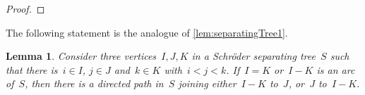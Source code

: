 \documentclass{amsart}
\newtheorem{lemma}[theorem]{Lemma}
\theoremstyle{definition}
\begin{document}
\begin{proof}
\end{proof}

The following statement is the analogue of \cref{lem:separatingTree1}.

\begin{lemma}
\label{lem:SchroderSeparatingTree1}
Consider three vertices~$I,J,K$ in a Schröder separating tree~$S$ such that there is~$i \in I$, $j \in J$ and~$k \in K$ with~$i < j < k$.
If~$I = K$ or~$I - K$ is an arc of~$S$, then there is a directed path in~$S$ joining either~$I-K$ to~$J$, or~$J$ to~$I-K$.
\end{lemma}
\end{document}
